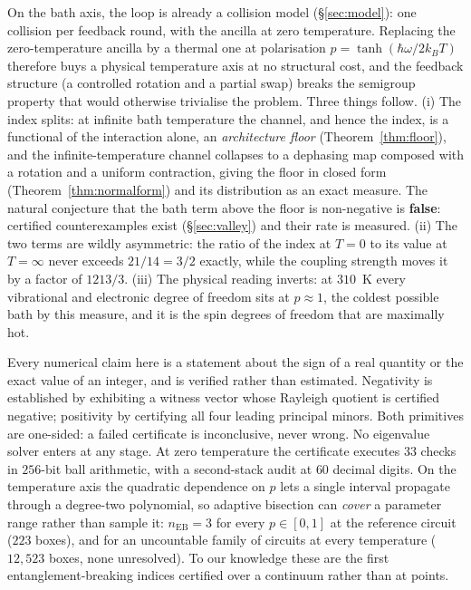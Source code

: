\documentclass[11pt,a4paper]{article}
\theoremstyle{definition}
\theoremstyle{remark}
\newcommand{\nEB}{n_{\mathrm{EB}}}
\begin{document}
On the bath axis, the loop is already a collision model
(\S\ref{sec:model}): one collision per feedback round, with the ancilla at
zero temperature. Replacing the zero-temperature ancilla by a thermal one at
polarisation $p=\tanh(\hbar\omega/2k_BT)$ therefore buys a physical
temperature axis at no structural cost, and the feedback structure (a
controlled rotation and a partial swap) breaks the semigroup property that
would otherwise trivialise the problem. Three things follow. (i) The index
splits: at infinite bath temperature the channel, and hence the index, is a
functional of the interaction alone, an \emph{architecture floor}
(Theorem~\ref{thm:floor}), and the infinite-temperature channel collapses to a
dephasing map composed with a rotation and a uniform contraction, giving the
floor in closed form (Theorem~\ref{thm:normalform}) and its distribution as an
exact measure. The natural conjecture that the bath term above the floor is
non-negative is \textbf{false}: certified counterexamples exist
(\S\ref{sec:valley}) and their rate is measured. (ii) The two terms are
wildly asymmetric: the ratio of the index at $T=0$ to its value at
$T=\infty$ never exceeds $21/14 = 3/2$ exactly, while the coupling strength
moves it by a factor of $1213/3$. (iii) The physical reading inverts: at
$310$~K every vibrational and electronic degree of freedom sits at
$p\approx1$, the coldest possible bath by this measure, and it is the spin
degrees of freedom that are maximally hot.

Every numerical claim here is a statement about the sign of a real quantity or
the exact value of an integer, and is verified rather than estimated.
Negativity is established by exhibiting a witness vector whose Rayleigh
quotient is certified negative; positivity by certifying all four leading
principal minors. Both primitives are one-sided: a failed certificate is
inconclusive, never wrong. No eigenvalue solver enters at any stage. At zero
temperature the certificate executes $33$ checks in $256$-bit ball arithmetic,
with a second-stack audit at $60$ decimal digits. On the temperature axis the
quadratic dependence on $p$ lets a single interval propagate through a
degree-two polynomial, so adaptive bisection can \emph{cover} a parameter
range rather than sample it: $\nEB = 3$ for every $p\in[0,1]$ at the reference
circuit ($223$ boxes), and for an uncountable family of circuits at every
temperature ($12{,}523$ boxes, none unresolved). To our knowledge these are
the first entanglement-breaking indices certified over a continuum rather than
at points.
\end{document}
